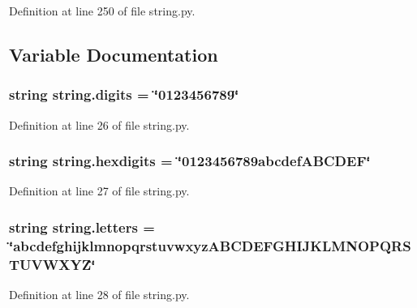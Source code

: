 Definition at line 250 of file string.\-py.



\subsection{Variable Documentation}
\hypertarget{namespacestring_aee808fa2139026484af927957ed5633f}{
\subsubsection[{digits}]{\setlength{\rightskip}{0pt plus 5cm}string string.\-digits = \char`\"{}0123456789\char`\"{}}}\label{namespacestring_aee808fa2139026484af927957ed5633f}


Definition at line 26 of file string.\-py.

\hypertarget{namespacestring_a529be5ca3e660d5529dd7c543d5d93ca}{
\subsubsection[{hexdigits}]{\setlength{\rightskip}{0pt plus 5cm}string string.\-hexdigits = \char`\"{}0123456789abcdef\-A\-B\-C\-D\-E\-F\char`\"{}}}\label{namespacestring_a529be5ca3e660d5529dd7c543d5d93ca}


Definition at line 27 of file string.\-py.

\hypertarget{namespacestring_a6c44b858e17ad0eb81b82cc34119f3e1}{
\subsubsection[{letters}]{\setlength{\rightskip}{0pt plus 5cm}string string.\-letters = \char`\"{}abcdefghijklmnopqrstuvwxyz\-A\-B\-C\-D\-E\-F\-G\-H\-I\-J\-K\-L\-M\-N\-O\-P\-Q\-R\-S\-T\-U\-V\-W\-X\-Y\-Z\char`\"{}}}\label{namespacestring_a6c44b858e17ad0eb81b82cc34119f3e1}


Definition at line 28 of file string.\-py.

